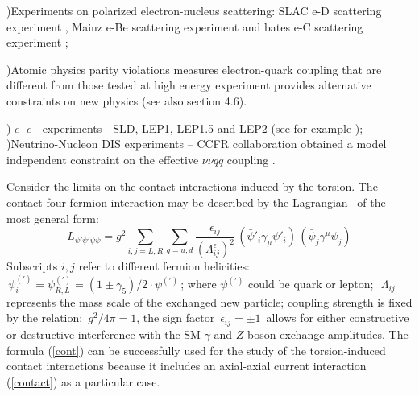)Experiments on polarized electron-nucleus scattering:
\noindent
SLAC e-D scattering experiment \cite{slac}, 
Mainz e-Be scattering
experiment \cite{mainz} and bates e-C scattering experiment 
\cite{bates};
\vskip 1mm

)Atomic physics parity violations measures \cite{apv}
electron-quark coupling that are different from those tested at
high energy experiment provides alternative constraints on new physics
(see also section 4.6).

\vskip 1mm
) $e^+e^-$ experiments  - SLD, LEP1, LEP1.5 and LEP2 (see for example
\cite{lep,opal,l3,aleph,lang});
\vskip 1mm
)Neutrino-Nucleon DIS experiments -- CCFR collaboration obtained 
a model independent constraint on the
effective $\nu\nu q q$ coupling \cite{ccfr}.
\vskip 1mm

Consider the limits on the contact interactions induced by the
torsion. The contact four-fermion interaction may be described by the
Lagrangian~\cite{eich} of the most general form:
\begin{equation}
L_{\psi'\psi'\psi\psi}=g^2\sum_{i,j=L,R}\sum_{q=u,d}\frac{\epsilon_{ij}}
{(\Lambda_{ij}^{\epsilon})^2}\,
(\bar \psi'_i\gamma_\mu \psi'_i)\,(\bar \psi_j\gamma^\mu \psi_j)
\label{cont}
\end{equation}
Subscripts $i,j$ refer to different fermion helicities:
$\, \psi^{(')}_i= \psi^{(')}_{R,L}= (1\pm\gamma_5)/2\cdot \psi^{(')}\,$;
where $ \psi^{(')}$ could be quark or lepton; $\,\,\Lambda_{ij}\,$
represents the mass scale of the exchanged new particle; coupling 
strength
is fixed by the relation: $\,g^2/4\pi=1$,
the sign factor  $\,\epsilon_{ij}=\pm 1\,$
allows for either constructive or destructive interference with
the SM $\gamma$ and $Z$-boson exchange amplitudes.
The formula (\ref{cont}) can be successfully used for the study of the
torsion-induced contact interactions because it includes an axial-axial
current interaction (\ref{contact}) as a particular case.

